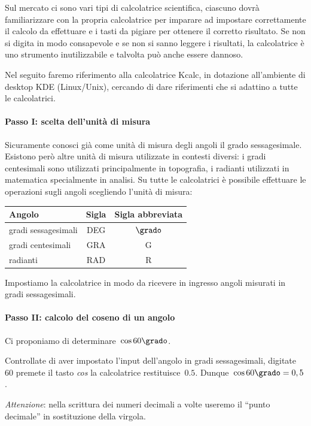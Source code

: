 Sul mercato ci sono vari tipi di calcolatrice scientifica, ciascuno dovrà 
familiarizzare con la propria calcolatrice per imparare
ad impostare correttamente il calcolo da effettuare e i tasti da pigiare per 
ottenere il corretto risultato. Se non si digita in
modo consapevole e se non si sanno leggere i risultati, la calcolatrice è uno 
strumento inutilizzabile e talvolta può anche essere dannoso.

Nel seguito faremo riferimento alla calcolatrice Kcalc, in dotazione 
all'ambiente di desktop KDE (Linux/Unix), cercando di dare
riferimenti che si adattino a tutte le calcolatrici.

\paragraph{Passo I: scelta dell'unità di misura}

Sicuramente conosci già come unità di misura degli angoli il grado 
sessagesimale. Esistono però altre unità di misura utilizzate in contesti 
diversi:
i gradi centesimali sono utilizzati principalmente in topografia, i radianti 
utilizzati in matematica specialmente in analisi.
Su tutte le calcolatrici è possibile effettuare le operazioni sugli angoli 
scegliendo l'unità di misura:
\begin{center}
\begin{tabular}{lcc}
\toprule
Angolo & Sigla & Sigla abbreviata \\
\midrule
gradi sessagesimali & DEG & \(\grado\) \\
gradi centesimali   & GRA & G \\
radianti            & RAD & R \\
\bottomrule
\end{tabular}
\end{center}
Impostiamo la calcolatrice in modo da ricevere in ingresso angoli misurati in 
gradi sessagesimali.

\paragraph{Passo II: calcolo del coseno di un angolo}
Ci proponiamo di determinare~\(\cos 60\grado\).

Controllate di aver impostato l'input dell'angolo in gradi sessagesimali,
digitate~\(60 \) premete il tasto \emph{cos} la calcolatrice restituisce~\(0.5\).
Dunque~\(\cos 60\grado=0,5\).

\emph{Attenzione}: nella scrittura dei numeri decimali a volte useremo 
il ``punto decimale'' in sostituzione della virgola.

